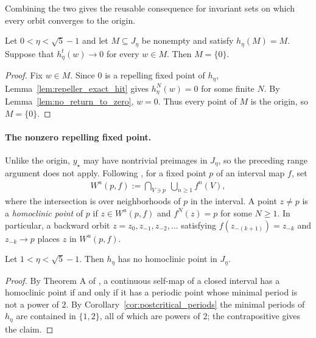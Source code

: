 \documentclass{article}
\begin{document}
Combining the two gives the reusable consequence for invariant sets on which
every orbit converges to the origin.

\begin{lemma}
\label{lem:invariant_set_origin}
Let $0<\eta<\sqrt5-1$ and let $M\subseteq J_\eta$ be nonempty and satisfy
$h_\eta(M)=M$. Suppose that $h_\eta^t(w)\to0$ for every $w\in M$. Then
$M=\{0\}$.
\end{lemma}

\begin{proof}
Fix $w\in M$. Since $0$ is a repelling fixed point of $h_\eta$,
Lemma~\ref{lem:repeller_exact_hit} gives $h_\eta^N(w)=0$ for some finite $N$.
By Lemma~\ref{lem:no_return_to_zero}, $w=0$. Thus every point of $M$ is the
origin, so $M=\{0\}$.
\end{proof}

\paragraph{The nonzero repelling fixed point.}
Unlike the origin, $y_\star$ may have nontrivial preimages in $J_\eta$, so the
preceding range argument does not apply. Following \citet{block1978homoclinic},
for a fixed point $p$ of an interval map $f$, set
\begin{align}
    W^u(p,f)
    :=
    \bigcap_{V\ni p}\ \bigcup_{n\ge1} f^n(V),
\end{align}
where the intersection is over neighborhoods of $p$ in the interval. A point
$z\ne p$ is a \emph{homoclinic point} of $p$ if $z\in W^u(p,f)$ and
$f^N(z)=p$ for some $N\ge1$. In particular, a backward orbit
$z=z_0,z_{-1},z_{-2},\ldots$ satisfying
$f(z_{-(k+1)})=z_{-k}$ and $z_{-k}\to p$ places $z$ in $W^u(p,f)$.

\begin{corollary}
\label{cor:no_homoclinic_reduced}
Let $1<\eta<\sqrt5-1$. Then $h_\eta$ has no homoclinic point in $J_\eta$.
\end{corollary}

\begin{proof}
By Theorem A of \citet{block1978homoclinic}, a continuous self-map of a closed
interval has a homoclinic point if and only if it has a periodic point whose
minimal period is not a power of $2$. By
Corollary~\ref{cor:postcritical_periods} the minimal periods of $h_\eta$ are
contained in $\{1,2\}$, all of which are powers of $2$; the contrapositive gives
the claim.
\end{proof}
\end{document}
